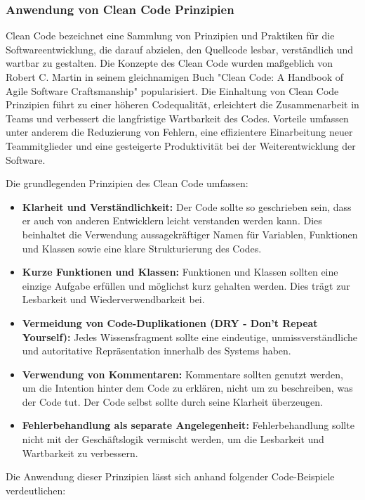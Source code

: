 \documentclass[../main.tex]{subfiles}
\begin{document}
\subsubsection{Anwendung von Clean Code Prinzipien}
Clean Code bezeichnet eine Sammlung von Prinzipien und Praktiken für die Softwareentwicklung, die darauf abzielen, den Quellcode lesbar, verständlich und wartbar 
zu gestalten. Die Konzepte des Clean Code wurden maßgeblich von Robert C. Martin in seinem gleichnamigen Buch "Clean Code: A Handbook of Agile Software Craftsmanship" 
popularisiert. Die Einhaltung von Clean Code Prinzipien führt zu einer höheren Codequalität, erleichtert die Zusammenarbeit in Teams und verbessert die langfristige 
Wartbarkeit des Codes. Vorteile umfassen unter anderem die Reduzierung von Fehlern, eine effizientere Einarbeitung neuer Teammitglieder und eine gesteigerte Produktivität 
bei der Weiterentwicklung der Software.

Die grundlegenden Prinzipien des Clean Code umfassen:

\begin{itemize}
  \item \textbf{Klarheit und Verständlichkeit:} Der Code sollte so geschrieben sein, dass er auch von anderen Entwicklern leicht verstanden werden kann. Dies beinhaltet 
  die Verwendung aussagekräftiger Namen für Variablen, Funktionen und Klassen sowie eine klare Strukturierung des Codes.
  \item \textbf{Kurze Funktionen und Klassen:} Funktionen und Klassen sollten eine einzige Aufgabe erfüllen und möglichst kurz gehalten werden. Dies trägt zur Lesbarkeit 
  und Wiederverwendbarkeit bei.
  \item \textbf{Vermeidung von Code-Duplikationen (DRY - Don't Repeat Yourself):} Jedes Wissensfragment sollte eine eindeutige, unmissverständliche und autoritative 
  Repräsentation innerhalb des Systems haben.
  \item \textbf{Verwendung von Kommentaren:} Kommentare sollten genutzt werden, um die Intention hinter dem Code zu erklären, nicht um zu beschreiben, was der Code tut. 
  Der Code selbst sollte durch seine Klarheit überzeugen.
  \item \textbf{Fehlerbehandlung als separate Angelegenheit:} Fehlerbehandlung sollte nicht mit der Geschäftslogik vermischt werden, um die Lesbarkeit und Wartbarkeit zu 
  verbessern.
\end{itemize}

Die Anwendung dieser Prinzipien lässt sich anhand folgender Code-Beispiele verdeutlichen:
\end{document}
